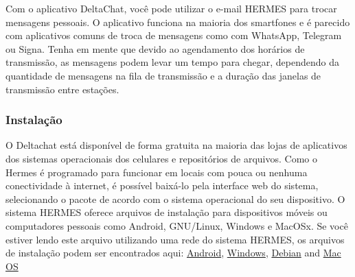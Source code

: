 \documentclass[11pt,a4paper]{article}
\begin{document}
Com o aplicativo DeltaChat, você pode utilizar o e-mail HERMES para trocar mensagens pessoais. O aplicativo funciona na maioria dos smartfones e é parecido com aplicativos comuns de troca de mensagens como com WhatsApp, Telegram ou Signa. Tenha em mente que devido ao agendamento dos horários de transmissão, as mensagens podem levar um tempo para chegar, dependendo da quantidade de mensagens na fila de transmissão e a duração das janelas de transmissão entre estações. 


\subsubsection{Instalação}

O Deltachat está disponível de forma gratuita na maioria das lojas de aplicativos dos sistemas operacionais dos celulares e repositórios de arquivos. Como o Hermes é programado para funcionar em locais com pouca ou nenhuma conectividade à internet, é possível baixá-lo pela interface web do sistema, selecionando o pacote de acordo com o sistema operacional do seu dispositivo. O sistema HERMES oferece arquivos de instalação para dispositivos móveis ou computadores pessoais como Android, GNU/Linux, Windows e MacOSx. Se você estiver lendo este arquivo utilizando uma rede do sistema HERMES, os arquivos de instalação podem ser encontrados aqui: \href{ http://10.0.0.1/dowloads/deltachat.apk}{Android},  \href{ http://10.0.0.1/dowloads/deltachat.exe}{Windows},  \href{ http://10.0.0.1/dowloads/deltachat.deb}{Debian} and \href{http://10.0.0.1/dowloads/deltachat.dmg}{Mac OS}

\end{document}
